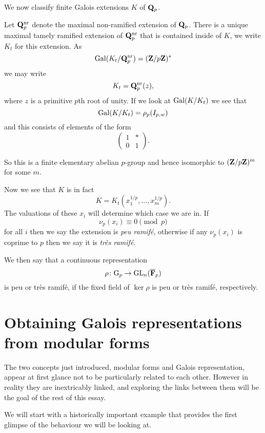 \documentclass[a4paper,12pt]{article}
\begin{document}
\begin{defn}
We now classify finite Galois extensions $K$ of $\mathbf{Q}_p$. %

Let $\mathbf{Q}_p^{\mathrm{nr}}$ denote the maximal non-ramified extension of $\mathbf{Q}_p$.
There is a unique maximal tamely ramified extension of $\mathbf{Q}_p^{\mathrm{nr}}$ that is contained inside of $K$, we write $K_t$ for this extension.
As
\[
\operatorname{Gal}(K_t/\mathbf{Q}_p^{\mathrm{nr}}) = (\mathbf{Z}/p\mathbf{Z})^*
\]
we may write
\[
K_t = \mathbf{Q}_p^{\mathrm{nr}}(z),
\]
where $z$ is a primitive $p$th root of unity.
If we look at $\operatorname{Gal}(K/K_t)$ we see that
\[
\operatorname{Gal}(K/K_t) = \rho_p(I_{p,w})
\]
and this consists of elements of the form
\[
\begin{pmatrix}
1 & * \\
0 & 1 \end{pmatrix}.
\]

So this is a finite elementary abelian $p$-group and hence isomorphic to $(\mathbf{Z}/p\mathbf{Z})^m$ for some $m$.

Now we see that $K$ is in fact
\[
K = K_t(x_1^{1/p},\ldots,x_m^{1/p}).
\]
The valuations of these $x_i$ will determine which case we are in.
If
\[
\nu_p(x_i) \equiv 0 \pmod{p}
\]
for all $i$ then we say the extension is \emph{peu ramif\'e}, otherwise if any $\nu_p(x_i)$ is coprime to $p$ then we say it is \emph{tr\`es ramif\'e}.

We then say that a continuous representation
\[
\rho\colon\mathrm{G}_p\to \operatorname{GL}_n(\overline{\mathbf{F}}_p)
\]
is peu or tr\`es ramif\'e, if the fixed field of $\ker\rho$ is peu or tr\`es ramif\'e, respectively.
\end{defn}


\section{Obtaining Galois representations from modular forms}
The two concepts just introduced, modular forms and Galois representation, appear at first glance not to be particularly related to each other.
However in reality they are inextricably linked, and exploring the links between them will be the goal of the rest of this essay.

We will start with a historically important example that provides the first glimpse of the behaviour we will be looking at.
\end{document}
